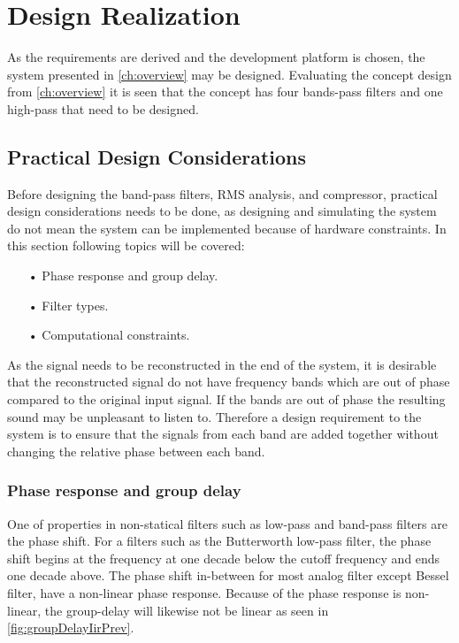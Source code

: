 \chapter{Design Realization} \label{ch:designRealization}
As the requirements are derived and the development platform is chosen, the system presented in \autoref{ch:overview} may be designed. Evaluating the concept design from \autoref{ch:overview} it is seen that the concept has four bands-pass filters and one high-pass that need to be designed.


\section{Practical Design Considerations}

Before designing the band-pass filters, RMS analysis, and compressor, practical design considerations needs to be done, as designing and simulating the system do not mean the system can be implemented because of hardware constraints. In this section following topics will be covered:

\begin{itemize}
\item[•] Phase response and group delay.
\item[•] Filter types.
\item[•] Computational constraints.
\end{itemize}

As the signal needs to be reconstructed in the end of the system, it is desirable that the reconstructed signal do not have frequency bands which are out of phase compared to the original input signal. If the bands are out of phase the resulting sound may be unpleasant to listen to. Therefore a design requirement to the system is to ensure that the signals from each band are added together without changing the relative phase between each band.


\subsection*{Phase response and group delay}
One of properties in non-statical filters such as low-pass and band-pass filters are the phase shift. For a filters such as the Butterworth low-pass filter, the phase shift begins at the frequency at one decade below the cutoff frequency and ends one decade above. The phase shift in-between for most analog filter except Bessel filter, have a non-linear phase response. Because of the phase response is non-linear, the group-delay will likewise not be linear as seen in \autoref{fig:groupDelayIirPrev}.

